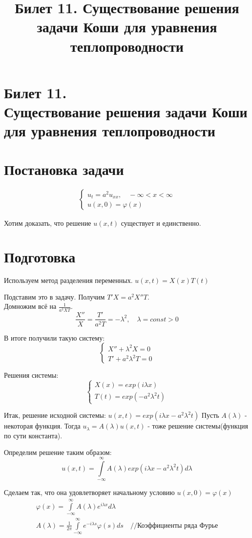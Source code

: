 \documentclass[11pt,a4paper, fqlen]{article}
\title{Билет 11. Существование  решения задачи Коши для уравнения теплопроводности}
\date{}
\begin{document}
	\section*{Билет 11. \\Существование  решения задачи Коши для уравнения теплопроводности}
	\section{Постановка задачи}
	\begin{gather}
	\begin{cases}
	u_t = a^2 u_{xx}, \quad -\infty < x < \infty\\
	u(x,0) = \varphi(x)
	\end{cases}
	\end{gather}
	
	Хотим доказать, что решение $u(x,t)$ существует и единственно.
	
	\section{Подготовка}
	
	Используем метод разделения переменных. $u(x,t) = X(x)T(t)$
	
	Подставим это в задачу. Получим $T'X = a^2X''T$. \\
	Домножим всё на $\frac{1}{a^2XT}$.
	$$\frac{X''}{X} = \frac{T'}{a^2 T} = -\lambda^2, \quad \lambda = const > 0$$
	
	В итоге получили такую систему:
	$$
	\begin{cases}
	X'' + \lambda^2X = 0 \\
	T' + a^2\lambda^2T = 0
	\end{cases}
	$$
	
	Решения системы: 
	\[
	\begin{cases}
	X(x) = exp(i \lambda x)\\
	T(t) = exp(-a^2 \lambda^2 t)
	\end{cases}
	\]
	
	Итак, решение исходной системы: $u(x,t) = exp(i \lambda x - a^2 \lambda^2 t)$
	Пусть $A(\lambda)$ - некоторая функция. Тогда $u_\lambda = A(\lambda)  u(x,t)$ - тоже решение системы(функция по сути константа).
	
	Определим решение таким образом:
	\[
	u(x,t) = \int \limits_{-\infty}^{\infty} A(\lambda) exp(i \lambda x - a^2 \lambda^2 t) d\lambda
	\]
	
	Сделаем так, что она удовлетворяет начальному условию $u(x,0) = \varphi(x)$
	\begin{gather}
	\varphi (x) = \int \limits_{-\infty}^{\infty} A(\lambda) e^{i\lambda x} d\lambda \\	
	A(\lambda) = \frac{1}{2\pi}  \int \limits_{-\infty}^{\infty} e^{-i \lambda s} \varphi(s) ds \quad \text{//Коэффициенты ряда Фурье}
	\end{gather}
	
\end{document}
